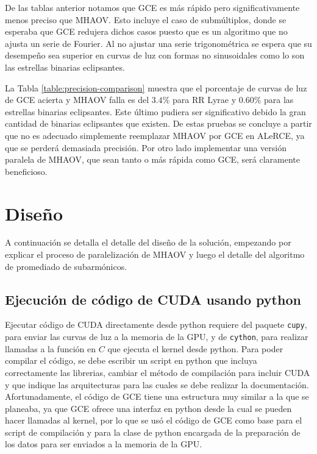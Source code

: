 De las tablas anterior notamos que GCE es más rápido pero significativamente menos preciso que MHAOV. Esto incluye el caso de submúltiplos, donde se esperaba que GCE redujera dichos casos puesto que es un algoritmo que no ajusta un serie de Fourier. Al no ajustar una serie trigonométrica se espera que su desempeño sea superior en curvas de luz con formas no sinusoidales como lo son las estrellas binarias eclipsantes. 

La Tabla \ref{table:precision-comparison} muestra que el porcentaje de curvas de luz de GCE acierta y MHAOV falla es del  $3.4\%$ para RR Lyrae y $0.60\%$ para las estrellas binarias eclipsantes.  Este último pudiera ser significativo debido la gran cantidad de binarias eclipsantes que existen. De estas pruebas se concluye a partir que no es adecuado simplemente reemplazar MHAOV por GCE en ALeRCE, ya que se perderá demasiada precisión. Por otro lado implementar una versión paralela de MHAOV, que sean tanto o más rápida como GCE, será claramente beneficioso.





\chapter{Diseño}\label{chap:diseño}
A continuación se detalla el detalle del diseño de la solución, empezando por explicar el proceso de paralelización de MHAOV y luego el detalle del algoritmo de promediado de subarmónicos.

\section{Ejecución de código de CUDA usando python}\label{sec:python-cuda}
Ejecutar código de CUDA directamente desde python requiere del paquete \texttt{cupy}, para enviar las curvas de luz a la memoria de la GPU, y de \texttt{cython}, para realizar llamadas a la función en $C$ que ejecuta el kernel desde python. Para poder compilar el código, se debe escribir un script en python que incluya correctamente las librerias, cambiar el método de compilación para incluir CUDA y que indique las arquitecturas para las cuales se debe realizar la documentación. Afortunadamente, el código de GCE tiene una estructura muy similar a la que se planeaba, ya que GCE ofrece una interfaz en python desde la cual se pueden hacer llamadas al kernel, por lo que se usó el código de GCE como base para el script de compilación y para la clase de python encargada de la preparación de los datos para ser enviados a la memoria de la GPU.

